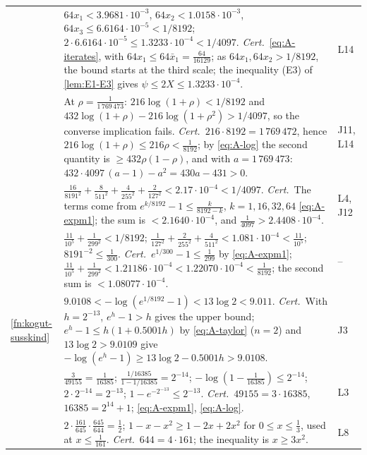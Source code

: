 \documentclass[11pt,a4paper]{amsart}
\theoremstyle{definition}
\theoremstyle{remark}
\numberwithin{equation}{section}
\newcommand{\dconst}{\frac{1}{4097}}       %
\newcommand{\xconst}{\frac{1}{8192}}       %
\newcommand{\dconstinl}{1/4097}            %
\newcommand{\xconstinl}{1/8192}            %
\begin{document}
{\begin{longtable}{@{}p{}p{}p{}@{}}
{thm:upward-closed} & $64x_1<3.9681\cdot10^{-3}$, $64x_2<1.0158\cdot10^{-3}$, $64x_3\le6.6164\cdot10^{-5}<\xconstinl$; $2\cdot6.6164\cdot10^{-5}\le1.3233\cdot10^{-4}<\dconstinl$. \emph{Cert.}\ \eqref{eq:A-iterates}, with $64x_1\le64\bar x_1=\frac{64}{16129}$; as $64x_1,64x_2>\xconstinl$, the bound starts at the third scale; the inequality (E3) of \cref{lem:E1-E3} gives $\psi\le2X\le1.3233\cdot10^{-4}$. & L14\\
{thm:upward-closed} & At $\rho=\frac1{1\,769\,473}$: $216\log(1+\rho)<\xconstinl$ and $432\log(1+\rho)-216\log(1+\rho^2)>\dconstinl$, so the converse implication fails. \emph{Cert.}\ $216\cdot8192=1\,769\,472$, hence $216\log(1+\rho)\le216\rho<\frac1{8192}$; by \eqref{eq:A-log} the second quantity is $\ge432\rho(1-\rho)$, and with $a=1\,769\,473$: $432\cdot4097\,(a-1)-a^2=430a-431>0$. & J11, L14\\
\midrule
{}{prop:hypercube-converse} & $\frac{16}{8191^2}+\frac8{511^2}+\frac4{255^2}+\frac2{127^2}<2.17\cdot10^{-4}<\dconstinl$. \emph{Cert.}\ The terms come from $e^{k/8192}-1\le\frac{k}{8192-k}$, $k=1,16,32,64$ \eqref{eq:A-expm1}; the sum is $<2.1640\cdot10^{-4}$, and $\frac1{4097}>2.4408\cdot10^{-4}$. & L4, J12\\
{thm:casimir-criterion} & $\frac{11}{10^5}+\frac1{299^2}<\xconstinl$; $\frac1{127^2}+\frac2{255^2}+\frac4{511^2}<1.081\cdot10^{-4}<\frac{11}{10^5}$; $8191^{-2}\le\frac1{300}$. \emph{Cert.}\ $e^{1/300}-1\le\frac1{299}$ by \eqref{eq:A-expm1}; $\frac{11}{10^5}+\frac1{299^2}<1.21186\cdot10^{-4}<1.22070\cdot10^{-4}<\frac1{8192}$; the second sum is $<1.08077\cdot10^{-4}$. & --\\
\cref{fn:kogut-susskind} & $9.0108<-\log(e^{1/8192}-1)<13\log2<9.011$. \emph{Cert.}\ With $h=2^{-13}$, $e^{h}-1>h$ gives the upper bound; $e^{h}-1\le h(1+0.5001h)$ by \eqref{eq:A-taylor} ($n=2$) and $13\log2>9.0109$ give $-\log(e^{h}-1)\ge13\log2-0.5001h>9.0108$. & J3\\
{thm:residue-split} & $\frac3{49155}=\frac1{16385}$; $\frac{1/16385}{1-1/16385}=2^{-14}$; $-\log(1-\frac1{16385})\le2^{-14}$; $2\cdot2^{-14}=2^{-13}$; $1-e^{-2^{-13}}\le2^{-13}$. \emph{Cert.}\ $49155=3\cdot16385$, $16385=2^{14}+1$; \eqref{eq:A-expm1}, \eqref{eq:A-log}. & L3\\
{prop:window-split} & $2\cdot\frac{161}{645}\cdot\frac{645}{644}=\frac12$; $1-x-x^2\ge1-2x+2x^2$ for $0\le x\le\frac13$, used at $x\le\frac1{161}$. \emph{Cert.}\ $644=4\cdot161$; the inequality is $x\ge3x^2$. & L8\\

\end{longtable}}
\end{document}
